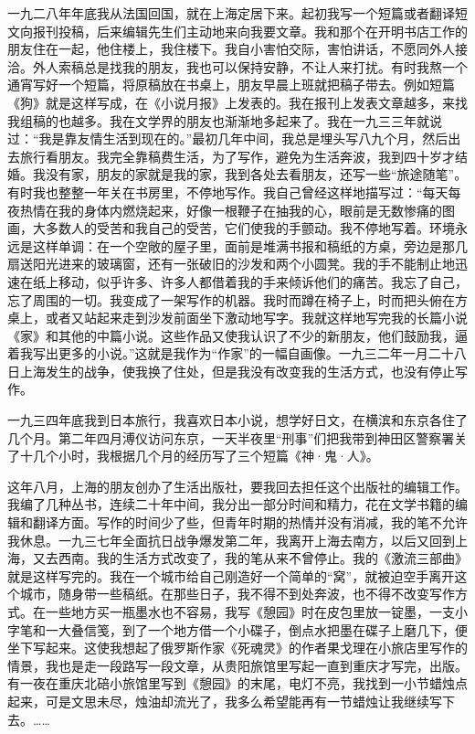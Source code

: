 \par 一九二八年年底我从法国回国，就在上海定居下来。起初我写一个短篇或者翻译短文向报刊投稿，后来编辑先生们主动地来向我要文章。我和那个在开明书店工作的朋友住在一起，他住楼上，我住楼下。我自小害怕交际，害怕讲话，不愿同外人接洽。外人索稿总是找我的朋友，我也可以保持安静，不让人来打扰。有时我熬一个通宵写好一个短篇，将原稿放在书桌上，朋友早晨上班就把稿子带去。例如短篇《狗》就是这样写成，在《小说月报》上发表的。我在报刊上发表文章越多，来找我组稿的也越多。我在文学界的朋友也渐渐地多起来了。我在一九三三年就说过：“我是靠友情生活到现在的。”最初几年中间，我总是埋头写八九个月，然后出去旅行看朋友。我完全靠稿费生活，为了写作，避免为生活奔波，我到四十岁才结婚。我没有家，朋友的家就是我的家，我到各处去看朋友，还写一些“旅途随笔”。有时我也整整一年关在书房里，不停地写作。我自己曾经这样地描写过：“每天每夜热情在我的身体内燃烧起来，好像一根鞭子在抽我的心，眼前是无数惨痛的图画，大多数人的受苦和我自己的受苦，它们使我的手颤动。我不停地写着。环境永远是这样单调：在一个空敞的屋子里，面前是堆满书报和稿纸的方桌，旁边是那几扇送阳光进来的玻璃窗，还有一张破旧的沙发和两个小圆凳。我的手不能制止地迅速在纸上移动，似乎许多、许多人都借着我的手来倾诉他们的痛苦。我忘了自己，忘了周围的一切。我变成了一架写作的机器。我时而蹲在椅子上，时而把头俯在方桌上，或者又站起来走到沙发前面坐下激动地写字。我就这样地写完我的长篇小说《家》和其他的中篇小说。这些作品又使我认识了不少的新朋友，他们鼓励我，逼着我写出更多的小说。”这就是我作为“作家”的一幅自画像。一九三二年一月二十八日上海发生的战争，使我换了住处，但是我没有改变我的生活方式，也没有停止写作。
\par 一九三四年底我到日本旅行，我喜欢日本小说，想学好日文，在横滨和东京各住了几个月。第二年四月溥仪访问东京，一天半夜里“刑事”们把我带到神田区警察署关了十几个小时，我根据几个月的经历写了三个短篇《神·鬼·人》。
\par 这年八月，上海的朋友创办了生活出版社，要我回去担任这个出版社的编辑工作。我编了几种丛书，连续二十年中间，我分出一部分时间和精力，花在文学书籍的编辑和翻译方面。写作的时间少了些，但青年时期的热情并没有消减，我的笔不允许我休息。一九三七年全面抗日战争爆发第二年，我离开上海去南方，以后又回到上海，又去西南。我的生活方式改变了，我的笔从来不曾停止。我的《激流三部曲》就是这样写完的。我在一个城市给自己刚造好一个简单的“窝”，就被迫空手离开这个城市，随身带一些稿纸。在那些日子，我不得不到处奔波，也不得不改变写作方式。在一些地方买一瓶墨水也不容易，我写《憩园》时在皮包里放一锭墨，一支小字笔和一大叠信笺，到了一个地方借一个小碟子，倒点水把墨在碟子上磨几下，便坐下写起来。这使我想起了俄罗斯作家《死魂灵》的作者果戈理在小旅店里写作的情景，我也是走一段路写一段文章，从贵阳旅馆里写起一直到重庆才写完，出版。有一夜在重庆北碚小旅馆里写到《憩园》的末尾，电灯不亮，我找到一小节蜡烛点起来，可是文思未尽，烛油却流光了，我多么希望能再有一节蜡烛让我继续写下去。……
